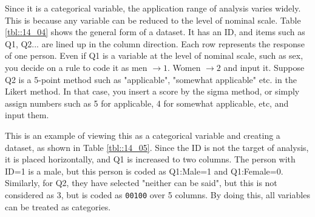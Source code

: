 \documentclass{ltjsbook}
\begin{document}
Since it is a categorical variable, the application range of analysis varies widely. This is because any variable can be reduced to the level of nominal scale. Table \ref{tbl::14_04} shows the general form of a dataset. It has an ID, and items such as Q1, Q2... are lined up in the column direction. Each row represents the response of one person. Even if Q1 is a variable at the level of nominal scale, such as sex, you decide on a rule to code it as men $\to1$. Women $\to2$ and input it. Suppose Q2 is a 5-point method such as "applicable", "somewhat applicable" etc. in the Likert method. In that case, you insert a score by the sigma method, or simply assign numbers such as 5 for applicable, 4 for somewhat applicable, etc, and input them.


This is an example of viewing this as a categorical variable and creating a dataset, as shown in Table \ref{tbl::14_05}. Since the ID is not the target of analysis, it is placed horizontally, and Q1 is increased to two columns. The person with ID=1 is a male, but this person is coded as Q1:Male=1 and Q1:Female=0. Similarly, for Q2, they have selected "neither can be said", but this is not considered as 3, but is coded as \texttt{00100} over 5 columns. By doing this, all variables can be treated as categories.



\end{document}
